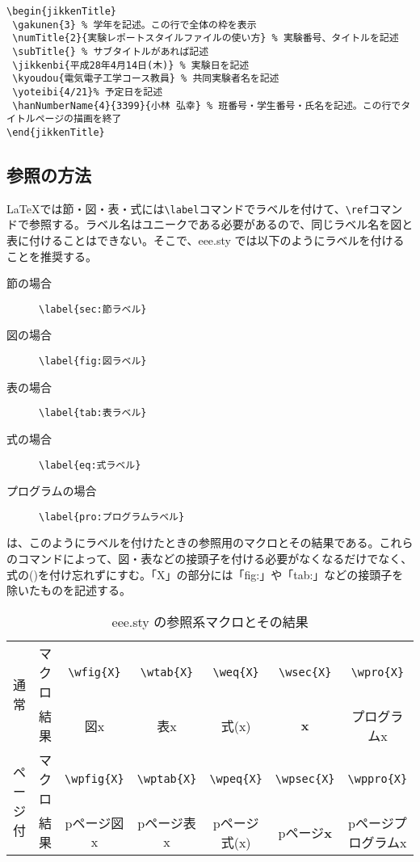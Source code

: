\documentclass[11pt,dvipdfmx]{jarticle}
\begin{document}
\begin{lstlisting}[language={[LaTeX]TeX},caption=表紙記述方法,label=pro:howToWriteTitle]
\begin{jikkenTitle}
 \gakunen{3} % 学年を記述。この行で全体の枠を表示
 \numTitle{2}{実験レポートスタイルファイルの使い方} % 実験番号、タイトルを記述
 \subTitle{} % サブタイトルがあれば記述
 \jikkenbi{平成28年4月14日(木)} % 実験日を記述
 \kyoudou{電気電子工学コース教員} % 共同実験者名を記述
 \yoteibi{4/21}% 予定日を記述
 \hanNumberName{4}{3399}{小林 弘幸} % 班番号・学生番号・氏名を記述。この行でタイトルページの描画を終了
\end{jikkenTitle}
\end{lstlisting}

\subsection{参照の方法}
\label{sec:reference}

\LaTeX では節・図・表・式には\verb+\label+コマンドでラベルを付けて、\verb+\ref+コマンドで参照する。ラベル名はユニークである必要があるので、同じラベル名を図と表に付けることはできない。そこで、eee.sty では以下のようにラベルを付けることを推奨する。
\begin{description}
 \item [節の場合] \verb+\label{sec:節ラベル}+
 \item [図の場合] \verb+\label{fig:図ラベル}+
 \item [表の場合] \verb+\label{tab:表ラベル}+
 \item [式の場合] \verb+\label{eq:式ラベル}+
 \item [プログラムの場合] \verb+\label{pro:プログラムラベル}+
\end{description}

は、このようにラベルを付けたときの参照用のマクロとその結果である。これらのコマンドによって、図・表などの接頭子を付ける必要がなくなるだけでなく、式の()を付け忘れずにすむ。「X」の部分には「fig:」や「tab:」などの接頭子を除いたものを記述する。
\begin{table}[tbp]
 {\small
  \centering
  \caption{eee.sty の参照系マクロとその結果}
  \label{tab:reference}
  \begin{tabular}{|c|c||c|c|c|c|c|}\hline
   \multirow{2}{*}{通常}
   & マクロ
   & \verb+\wfig{X}+
   & \verb+\wtab{X}+
   & \verb+\weq{X}+
   & \verb+\wsec{X}+
   & \verb+\wpro{X}+
   \\ \cline{2-7}
   & 結果
   & 図x
   & 表x
   & 式(x)
   & \bf{x}
   & プログラムx
   \\ \hline
   \multirow{2}{*}{ページ付}
   & マクロ
   & \verb+\wpfig{X}+
   & \verb+\wptab{X}+
   & \verb+\wpeq{X}+
   & \verb+\wpsec{X}+
   & \verb+\wppro{X}+
   \\ \cline{2-7}
   & 結果
   & pページ図x
   & pページ表x
   & pページ式(x)
   & pページ\bf{x}
   & pページプログラムx
   \\ \hline
  \end{tabular}
 }
\end{table}
\end{document}
